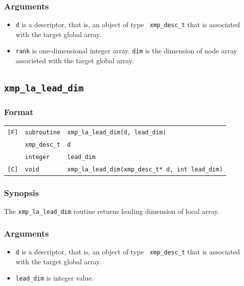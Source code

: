\subsubsection*{Arguments}

\begin{itemize}
 \item {\tt d} is a descriptor, that is, an object of type {\tt
       xmp\_desc\_t} that is associated with the target global array.
 \item {\tt rank} is one-dimensional integer array. {\tt dim} is the dimension of 
 node array associeted with the target global array.
\end{itemize}

\subsection{\tt xmp\_la\_lead\_dim}

\subsubsection*{Format}

\begin{tabular}{lll}

\verb![F]!&  {\tt subroutine}& {\tt xmp\_la\_lead\_dim(d, lead\_dim)}\\
          & {\tt xmp\_desc\_t} & {\tt d}\\
          & {\tt integer} & {\tt lead\_dim}\\

\verb![C]!&  {\tt void}& {\tt xmp\_la\_lead\_dim(xmp\_desc\_t* d, int lead\_dim)}\\

\end{tabular}

\subsubsection*{Synopsis}

The {\tt xmp\_la\_lead\_dim} routine returns leading dimension of local array.

\subsubsection*{Arguments}

\begin{itemize}
 \item {\tt d} is a descriptor, that is, an object of type {\tt
       xmp\_desc\_t} that is associated with the target global array.
 \item {\tt lead\_dim} is integer value.
\end{itemize}


